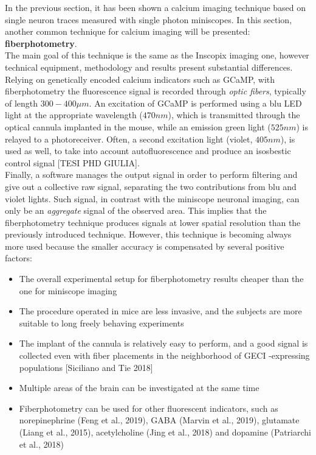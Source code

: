 \documentclass[a4paper]{article}
\begin{document}
In the previous section, it has been shown a calcium imaging technique based on single neuron traces measured with single photon miniscopes. In this section, another common technique for calcium imaging will be presented: \textbf{fiberphotometry}. \\
The main goal of this technique is the same as the Inscopix imaging one, however technical equipment, methodology and results present substantial differences.\\
Relying on genetically encoded calcium indicators such as GCaMP, with fiberphotometry the fluorescence signal is recorded through \textit{optic fibers}, typically of length $300-400 \mu m$. An excitation of GCaMP is performed using a blu LED light at the appropriate wavelength ($470 nm$), which is transmitted through the optical cannula implanted in the mouse, while an emission green light ($525 nm$) is relayed to a photoreceiver. Often, a second excitation light (violet, $405 nm$), is used as well, to take into account autofluorescence and produce an isosbestic control signal [TESI PHD GIULIA].\\
 Finally, a software manages the output signal in order to perform filtering and give out a collective raw signal, separating the two contributions from blu and violet lights. Such signal, in contrast with the miniscope neuronal imaging, can only be an \textit{aggregate} signal of the observed area. This implies that the fiberphotometry technique produces signals at lower spatial resolution than the previously introduced technique. However, this technique is becoming always more used because the smaller accuracy is compensated by several positive factors:

\begin{itemize}
	
	\item The overall experimental setup for fiberphotometry results cheaper than the one for miniscope imaging 
	
	\item The procedure operated in mice are less invasive, and the subjects are more suitable to long freely behaving experiments
	
	\item The implant of the cannula is relatively easy to perform, and a good signal is collected even with fiber placements in the neighborhood of GECI -expressing populations [Siciliano and Tie 2018]
	
	\item Multiple areas of the brain can be investigated at the same time 
	
	\item Fiberphotometry can be used for other fluorescent indicators, such as norepinephrine (Feng et al., 2019), GABA (Marvin et al., 2019), glutamate (Liang et al., 2015),
	acetylcholine (Jing et al., 2018) and dopamine (Patriarchi et al., 2018)
	
	
	
\end{itemize}
\end{document}
